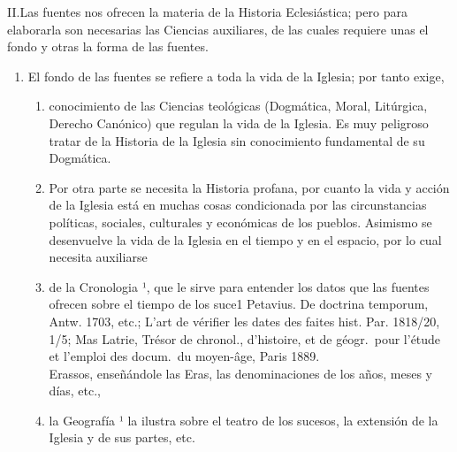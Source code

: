 \raggedbottom{} \documentclass[12pt, a4paper]{book}
\begin{document}
II.\@ Las fuentes nos ofrecen la materia de la Historia Eclesiástica; pero para elaborarla son necesarias las Ciencias auxiliares, de las cuales requiere unas el fondo y otras la forma de las fuentes.
\begin{enumerate}
  \item El fondo de las fuentes se refiere a toda la vida de la Iglesia;
        por tanto exige,\begin{enumerate}
          \item conocimiento de las Ciencias teológicas (Dogmática, Moral, Litúrgica, Derecho Canónico) que regulan la vida de la Iglesia. Es muy peligroso tratar de la Historia de la Iglesia sin conocimiento fundamental de su Dogmática.
          \item Por otra parte se necesita la Historia profana, por cuanto la vida y acción de la Iglesia está en muchas cosas condicionada por las circunstancias políticas, sociales, culturales y económicas de los pueblos. Asimismo se desenvuelve la vida de la Iglesia en el tiempo y en el espacio, por lo cual necesita auxiliarse
          \item de la Cronologia ¹, que le sirve para entender los datos que las fuentes ofrecen sobre el tiempo de los suce1 Petavius. De doctrina temporum, Antw. 1703, etc.; L'art de vérifier les dates des faites hist. Par. 1818/20, 1/5; Mas Latrie, Trésor de chronol., d'histoire, et de géogr.\ pour l'étude et l'emploi des docum.\ du moyen-âge, Paris 1889.\\ Erassos, enseñándole las Eras, las denominaciones de los años, meses y días, etc.,
          \item la Geografía ¹ la ilustra sobre el teatro de los sucesos, la extensión de la Iglesia y de sus partes, etc.



\end{enumerate}
\end{enumerate}
\end{document}
